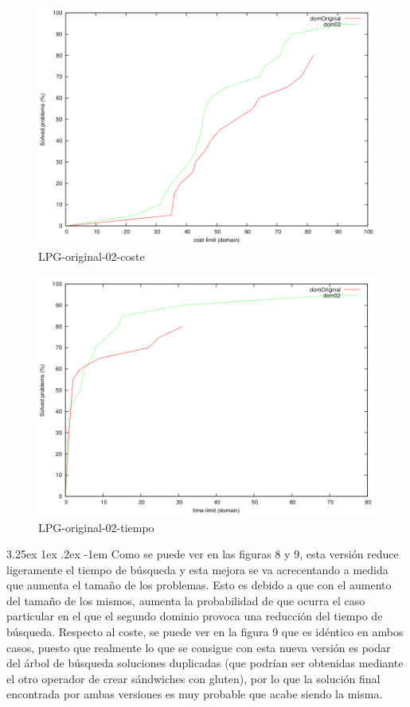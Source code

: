 \documentclass{article}
\makeatletter
\renewcommand\paragraph{\@startsection{paragraph}{5}{\z@}%
      {3.25ex \@plus1ex \@minus.2ex}%
      {-1em}%
      {\normalfont\normalsize\bfseries}}
\makeatother
\begin{document}
    \begin{figure}[H]
        \centering
        \includegraphics[width=12cm, height=8cm]{lpg-or-02-cost}
        \caption{LPG-original-02-coste}
    \end{figure}
    
    \begin{figure}[H]
        \centering
        \includegraphics[width=12cm, height=8cm]{lpg-or-02-time}
        \caption{LPG-original-02-tiempo}
    \end{figure}
    
    \paragraph{}
    Como se puede ver en las figuras 8 y 9, esta versión reduce ligeramente el tiempo de búsqueda y esta mejora se va acrecentando a medida que aumenta el tamaño de los problemas. Esto es debido a que con el aumento del tamaño de los mismos, aumenta la probabilidad de que ocurra el caso particular en el que el segundo dominio provoca una reducción del tiempo de búsqueda. Respecto al coste, se puede ver en la figura 9 que es idéntico en ambos casos, puesto que realmente lo que se consigue con esta nueva versión es podar del árbol de búsqueda soluciones duplicadas (que podrían ser obtenidas mediante el otro operador de crear sándwiches con gluten), por lo que la solución final encontrada por ambas versiones es muy probable que acabe siendo la misma.
    
\end{document}
